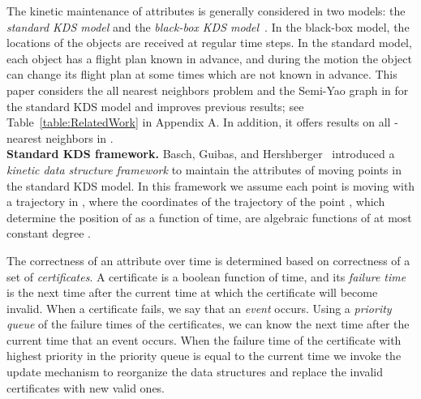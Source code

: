 \documentclass[11pt]{llncs}
\begin{document}
The kinetic maintenance of attributes is generally considered in two models: the \textit{standard KDS model} and the \textit{black-box KDS model}~\cite{Gao:2006:DSA:1646483.1646577,deBerg:2011:KCH:1998196.1998233}. In the black-box model, the locations of the objects are received at regular time steps. In the standard model, each object has a flight plan known in advance, and during the motion the object can change its flight plan at some times which are not known in advance. This paper considers the all nearest neighbors problem and the Semi-Yao graph in  for the standard KDS model and improves previous results; see Table~\ref{table:RelatedWork} in Appendix A. In addition, it offers results on all -nearest neighbors in .
\vspace{+5pt}
\\
\textbf{Standard KDS framework.}
Basch, Guibas, and Hershberger~\cite{Basch:1997:DSM:314161.314435} introduced a \textit{kinetic data structure framework} to maintain the attributes of moving points in the standard KDS model. In this framework we assume each point  is moving with a trajectory  in , where the  coordinates of the trajectory of  the point , which determine the position of  as a function of time, are  algebraic functions of at most constant degree .  

The correctness of an attribute over time is determined based on correctness of a set of \textit{certificates}. A certificate is a boolean function of time, and its \textit{failure time} is the next time after the current time at which the certificate will become invalid. When a certificate fails, we say that an \textit{event} occurs. Using a \textit{priority queue} of the failure times of the certificates, we can know the next time after the current time that an event occurs. When the failure time of the certificate with highest priority in the priority queue is equal to the current time we invoke the update mechanism to reorganize the data structures and replace the invalid certificates with new valid ones. 
\end{document}
